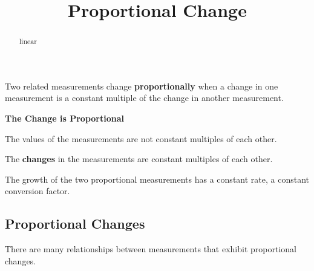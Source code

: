 \documentclass{ximera}
\title{Proportional Change}
\begin{document}
\begin{abstract}
linear
\end{abstract}
\maketitle



Two related measurements change \textbf{\textcolor{blue!55!black}{proportionally}} when a change in one measurement is a constant multiple of the change in another measurement. 


\begin{warning} \textbf{\textcolor{red!70!black}{The Change is Proportional}}


The values of the measurements are not constant multiples of each other. 


The \textbf{\textcolor{red!70!black}{changes}} in the measurements are constant multiples of each other.

\end{warning}


The growth of the two proportional measurements has a constant rate, a constant conversion factor. 





\subsection*{Proportional Changes}




There are many relationships between measurements that exhibit proportional changes.  
\end{document}
